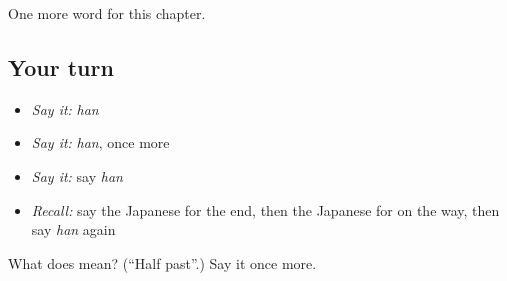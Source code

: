\begin{grammarlens}[title={What you've built}]
One more word for this chapter.
\end{grammarlens}

\subsection*{Your turn}
\begin{itemize}
\raggedright
  \item \emph{Say it:} \emph{han}
  \item \emph{Say it:} \emph{han}, once more
  \item \emph{Say it:} say \emph{han}
  \item \emph{Recall:} say the Japanese for the end, then the Japanese for on the way, then say \emph{han} again
\end{itemize}

\begin{tcolorbox}[breakable,colback=teal!4,colframe=teal!35!black,title={Before you move on}]
What does  mean? (\textquotedblleft{}Half past\textquotedblright{}.) Say it once more.
\end{tcolorbox}
